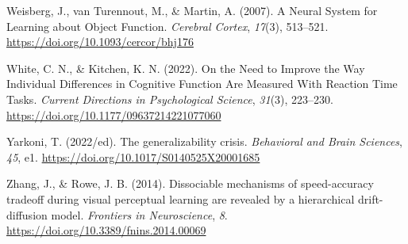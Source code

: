 \documentclass[
  man, donotrepeattitle,floatsintext]{apa6}
\newlength{\cslhangindent}
\newenvironment{CSLReferences}[2] %
 {\begin{list}{}{%
  \setlength{\itemindent}{0pt}
  \setlength{\leftmargin}{0pt}
  \setlength{\parsep}{0pt}
  \ifodd #1
   \setlength{\leftmargin}{\cslhangindent}
   \setlength{\itemindent}{-1\cslhangindent}
  \fi
  \setlength{\itemsep}{#2\baselineskip}}}
 {\end{list}}
\begin{document}
\begin{CSLReferences}{1}{0}
Weisberg, J., van Turennout, M., \& Martin, A. (2007). A {Neural System} for {Learning} about {Object Function}. \emph{Cerebral Cortex}, \emph{17}(3), 513--521. \url{https://doi.org/10.1093/cercor/bhj176}

White, C. N., \& Kitchen, K. N. (2022). On the {Need} to {Improve} the {Way Individual Differences} in {Cognitive Function Are Measured With Reaction Time Tasks}. \emph{Current Directions in Psychological Science}, \emph{31}(3), 223--230. \url{https://doi.org/10.1177/09637214221077060}

Yarkoni, T. (2022/ed). The generalizability crisis. \emph{Behavioral and Brain Sciences}, \emph{45}, e1. \url{https://doi.org/10.1017/S0140525X20001685}

Zhang, J., \& Rowe, J. B. (2014). Dissociable mechanisms of speed-accuracy tradeoff during visual perceptual learning are revealed by a hierarchical drift-diffusion model. \emph{Frontiers in Neuroscience}, \emph{8}. \url{https://doi.org/10.3389/fnins.2014.00069}

\end{CSLReferences}
\end{document}

